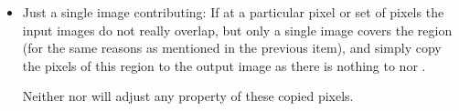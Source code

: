\begin{itemize}
\item
  Just a single image contributing: If at a particular pixel or set of pixels the input images
  do not really overlap, but only a single image covers the region (for the same reasons as
  mentioned in the previous item), \App{} and \OtherApp{} simply copy the pixels of this region
  to the output image as there is nothing to \appdoes{} nor \otherappdoes.

  Neither \App{} nor \OtherApp{} will adjust any property of these copied pixels.
\end{itemize}



